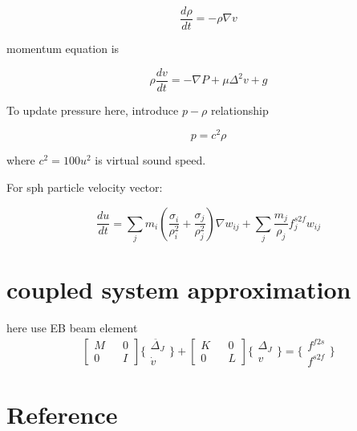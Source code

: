 \documentclass[11pt]{article}
\begin{document}
$$ \frac{d \rho}{dt} = - \rho \nabla  v $$

momentum equation is 

$$ \rho \frac{dv}{dt} = - \nabla P + \mu \Delta^2 v + g $$

To update pressure here, introduce $p-\rho$ relationship

$$ p = c^2 \rho$$

where $ c^2 = 100 u^2 $ is virtual sound speed. 

For sph particle velocity vector:

$$ \frac{du}{dt} = \sum_j m_i( \frac{\sigma_i}{\rho ^2 _i } + \frac{\sigma_j}{\rho^2 _j} )\nabla w_{ij} + \sum_j \frac{m_j}{\rho _j} f^{s2f}_j w_{ij} $$


\section{coupled system approximation}


here use EB beam element
 $$ \begin{bmatrix} M && 0 \\ 0 && I \end{bmatrix} \{ \begin{array}{c} \ddot{\Delta_J} \\ \dot{v} \end{array} \} + \begin{bmatrix} K && 0 \\ 0 && L \end{bmatrix} \{ \begin{array}{c} \Delta_J \\ v \end{array} \} = \{ \begin{array}{c} f^{f2s}\\ f^{s2f} \end{array} \} $$


\section{Reference}
% 
\end{document}
